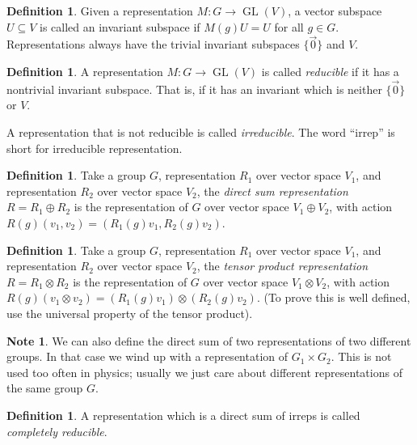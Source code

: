 \documentclass[12pt, letterpaper]{article}
\theoremstyle{definition} %
\newtheorem{defn}[thm]{Definition} %
\newtheorem{note}[thm]{Note}
\def\GL{\operatorname{GL}}
\begin{document}
\begin{defn}
  Given a representation $M:G\to \GL(V)$, a vector subspace $U\subseteq V$ is called an invariant subspace if
  $M(g)U=U$ for all $g\in G$. Representations always have the trivial invariant subspaces $\{\vec{0}\}$ and $V$.
\end{defn}

\begin{defn}
  A representation $M:G\to \GL(V)$ is called \emph{reducible} if it has a nontrivial invariant subspace. 
  That is, if it has an invariant which is neither $\{\vec{0}\}$ or $V$.
  
  A representation that is not reducible is called \emph{irreducible}. The word ``irrep'' is short for irreducible representation.
\end{defn}

\begin{defn}
  Take a group $G$, representation $R_1$ over vector space $V_1$, and representation $R_2$ over vector space $V_2$,
  the \emph{direct sum representation} $R=R_1\oplus R_2$ is the representation of $G$ over vector space
  $V_1\oplus V_2$, with action $R(g)(v_1,v_2)=(R_1(g)v_1,R_2(g)v_2)$. 
\end{defn}

\begin{defn}
  Take a group $G$, representation $R_1$ over vector space $V_1$, and representation $R_2$ over vector space $V_2$,
  the \emph{tensor product representation} $R=R_1\otimes R_2$ is the representation of $G$ over vector space
  $V_1\otimes V_2$, with action $R(g)(v_1\otimes v_2)=(R_1(g)v_1)\otimes(R_2(g)v_2)$. (To prove  this is well defined,
  use the universal property of the tensor product).
\end{defn}
\begin{note}
  We can also define the direct sum of two representations of two different groups. In that case we wind up with 
  a representation of $G_1\times G_2$. This is not used too often in physics; usually we just care about different representations
  of the same group $G$.
\end{note}
\begin{defn}
  A representation which is a direct sum of irreps is called \emph{completely reducible}.
\end{defn}
\end{document}
